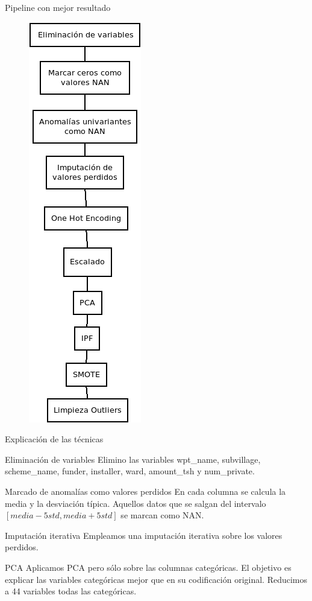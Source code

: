 \begin{frame}{Pipeline con mejor resultado}
	\begin{figure}[H]
		\centering
		\includegraphics[scale=0.33]{./figures/knn/pipeline_final.png}
	\end{figure}
\end{frame}

\begin{frame}{Explicación de las técnicas}
	\vspace{10px}
	\pause
	\begin{block}{Eliminación de variables}
		Elimino las variables wpt\_name, subvillage, scheme\_name, funder, installer, ward, amount\_tsh y num\_private.
	\end{block}
	\pause
	\begin{block}{Marcado de anomalías como valores perdidos}
		En cada columna se calcula la media y la desviación típica. Aquellos datos que se salgan del intervalo $[media-5std, media+5std]$ se marcan como NAN.
	\end{block}
	\pause
	\begin{block}{Imputación iterativa}
		Empleamos una imputación iterativa sobre los valores perdidos.
	\end{block}
	\pause
	\begin{block}{PCA}
		Aplicamos PCA pero sólo sobre las columnas categóricas. El objetivo es explicar las variables categóricas mejor que en su codificación original. Reducimos a 44 variables todas las categóricas.
	\end{block}
\end{frame}

